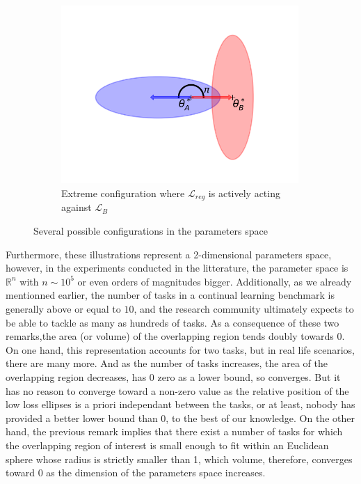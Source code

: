 \documentclass[11pt]{article}
\begin{document}
\begin{figure}
\begin{subfigure}[b]{0.3\textwidth}
        \label{fig:two_ellipses_90}
    \end{subfigure}
    \hspace{-0mm}
    \begin{subfigure}[b]{0.3\textwidth}
        \centering
        \includegraphics[width=0.99\textwidth]{images/ellipse_overlap_180.png}
        \caption{Extreme configuration where $\mathcal{L}_{reg}$ is actively acting against $\mathcal{L}_B$}
        \label{fig:two_ellipses_180}
    \end{subfigure}
    \caption{Several possible configurations in the parameters space}
    \label{fig:other_ellipses}
\end{figure}


\vspace{2mm}
\noindent
Furthermore, these illustrations represent a 2-dimensional parameters space, however, in the experiments conducted in the litterature, the parameter space is $\mathbb{R}^n$ with $n \sim 10^5$ or even orders of magnitudes bigger. Additionally, as we already mentionned earlier, the number of tasks in a continual learning benchmark is generally above or equal to $10$, and the research community ultimately expects to be able to tackle as many as hundreds of tasks. As a consequence of these two remarks,the area (or volume) of the overlapping region tends doubly towards 0. On one hand, this representation accounts for two tasks, but in real life scenarios, there are many more. And as the number of tasks increases, the area of the overlapping region decreases, has 0 zero as a lower bound, so converges. But it has no reason to converge toward a non-zero value as the relative position of the low loss ellipses is a priori independant between the tasks, or at least, nobody has provided a better lower bound than 0, to the best of our knowledge. On the other hand, the previous remark implies that there exist a number of tasks for which the overlapping region of interest is small enough to fit within an Euclidean sphere whose radius is strictly smaller than 1, which volume, therefore, converges toward 0 as the dimension of the parameters space increases. 
\end{document}
